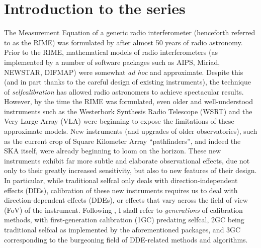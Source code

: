 \documentclass{aa}
\begin{document}

\maketitle

\section*{Introduction to the series}

The Measurement Equation of a generic radio interferometer (henceforth referred to as the RIME) was formulated by \citet{ME1} after almost 50 years of radio astronomy. Prior to the RIME, mathematical models of radio interferometers (as implemented by a number of software packages such as AIPS, Miriad, NEWSTAR, DIFMAP) were somewhat \emph{ad hoc} and approximate. Despite this (and in part thanks to the careful design of existing instruments), the technique of {\em selfcalibration} \citep{Cornwell:selfcal} has allowed radio astronomers to achieve spectacular results. However, by the time the RIME was formulated, even older and well-understood instruments such as the Westerbork Synthesis Radio Telescope (WSRT) and the Very Large Array (VLA) were beginning to expose the limitations of these approximate models. New instruments (and upgrades of older observatories), such as the current crop of Square Kilometer Array \citep{Schilizzi:SKA} ``pathfinders'', and indeed the SKA itself, were already beginning to loom on the horizon. These new instruments exhibit far more subtle and elaborate observational effects, due not only to their greatly increased sensitivity, but also to new features of their design. In particular, while traditional selfcal only deals with direction-independent effects (DIEs), calibration of these new instruments requires us to deal with direction-dependent effects (DDEs), or effects that vary across the field of view (FoV) of the instrument. Following \citet{meqtrees}, I shall refer to \emph{generations} of calibration methods, with first-generation calibration (1GC) predating selfcal, 2GC being traditional selfcal as implemented by the aforementioned packages, and 3GC corresponding to the burgeoning field of DDE-related methods and algorithms. 
\end{document}
